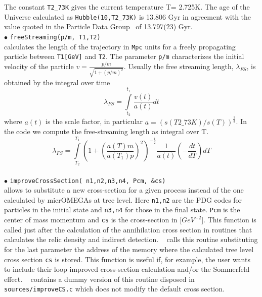 \documentclass[12pt,a4paper]{article}
\begin{document}
The constant \verb|T2_73K| gives  the  current temperature T= 2.725K. The age of the Universe  calculated as
\verb|Hubble(10,T2_73K)| is 13.806  Gyr in agreement with the value quoted in the Particle Data Group~\cite{Nakamura:2010zzi}
of 13.797(23) Gyr. 
%
\\
\noindent$\bullet$ \verb|freeStreaming(p/m, T1,T2)|\\
calculates  the length of the  trajectory in {\tt Mpc} units  for a freely propagating particle between 
{\tt T1[GeV]} and  {\tt T2}. The parameter {\tt p/m} 
characterizes the initial velocity of the particle $v=\frac{p/m}{\sqrt{ 1+ (p/m)^2}}$.
Usually the free streaming length, $\lambda_{FS}$,  is obtained by the integral over time 
\begin{equation}
 \lambda_{FS}=   \int \limits_{t_2}^{t_1}  \frac{v(t)}{ a(t)}dt 
 \end{equation}
 where $a(t)$ is the scale factor, in particular  $ a = \left( s(T2\_73K)/s(T)\right)^{\frac{1}{3}}$. In the code we compute the free-streaming length
as integral over T.
\begin{equation}
 \lambda_{FS}=  \int
\limits_{T_2}^{T_1}  \left( 1+ \left(\frac{
a(T)m}{ a(T_1)p}\right)^2\right)^{-\frac{1}{2}} \frac{1}{a(t)} \left(-\frac{dt}{dT} \right) dT
\end{equation}  
\\  
%
\noindent$\bullet$ \verb|improveCrossSection( n1,n2,n3,n4, Pcm, &cs)|\\
allows to substitute a new cross-section for a given process instead of the one calculated by
micrOMEGAs at tree level.  Here \verb|n1,n2| are the PDG codes  for  particles in the initial state and
\verb|n3,n4| for those in the final state. \verb|Pcm| is the center of mass momentum and \verb|cs| is the cross-section in
[$GeV^{-2}$].  This function is called just after the calculation
of the annihilation cross section in routines that calculates the  relic density
and indirect detection. \micro~   calls this routine substituting
for the last parameter the address of the memory where the calculated tree level cross section
{\tt cs} is
stored.
 This function is useful if, for example, the user wants to include their loop improved cross-section 
calculation and/or the  Sommerfeld effect.
 \micro~  contains  a dummy version of this routine  disposed in 
\verb|sources/improveCS.c| which does not modify the default  cross section.
\end{document}
